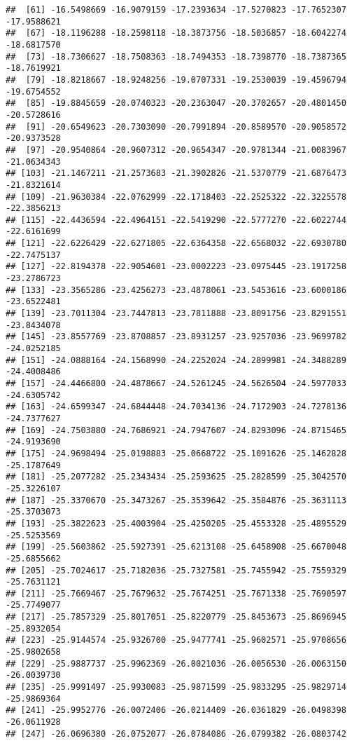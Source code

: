 \documentclass[
]{article}
\begin{document}
\begin{verbatim}
##  [61] -16.5498669 -16.9079159 -17.2393634 -17.5270823 -17.7652307 -17.9588621
##  [67] -18.1196288 -18.2598118 -18.3873756 -18.5036857 -18.6042274 -18.6817570
##  [73] -18.7306627 -18.7508363 -18.7494353 -18.7398770 -18.7387365 -18.7619921
##  [79] -18.8218667 -18.9248256 -19.0707331 -19.2530039 -19.4596794 -19.6754552
##  [85] -19.8845659 -20.0740323 -20.2363047 -20.3702657 -20.4801450 -20.5728616
##  [91] -20.6549623 -20.7303090 -20.7991894 -20.8589570 -20.9058572 -20.9373528
##  [97] -20.9540864 -20.9607312 -20.9654347 -20.9781344 -21.0083967 -21.0634343
## [103] -21.1467211 -21.2573683 -21.3902826 -21.5370779 -21.6876473 -21.8321614
## [109] -21.9630384 -22.0762999 -22.1718403 -22.2525322 -22.3225578 -22.3856213
## [115] -22.4436594 -22.4964151 -22.5419290 -22.5777270 -22.6022744 -22.6161699
## [121] -22.6226429 -22.6271805 -22.6364358 -22.6568032 -22.6930780 -22.7475137
## [127] -22.8194378 -22.9054601 -23.0002223 -23.0975445 -23.1917258 -23.2786723
## [133] -23.3565286 -23.4256273 -23.4878061 -23.5453616 -23.6000186 -23.6522481
## [139] -23.7011304 -23.7447813 -23.7811888 -23.8091756 -23.8291551 -23.8434078
## [145] -23.8557769 -23.8708857 -23.8931257 -23.9257036 -23.9699782 -24.0252185
## [151] -24.0888164 -24.1568990 -24.2252024 -24.2899981 -24.3488289 -24.4008486
## [157] -24.4466800 -24.4878667 -24.5261245 -24.5626504 -24.5977033 -24.6305742
## [163] -24.6599347 -24.6844448 -24.7034136 -24.7172903 -24.7278136 -24.7377627
## [169] -24.7503880 -24.7686921 -24.7947607 -24.8293096 -24.8715465 -24.9193690
## [175] -24.9698494 -25.0198883 -25.0668722 -25.1091626 -25.1462828 -25.1787649
## [181] -25.2077282 -25.2343434 -25.2593625 -25.2828599 -25.3042570 -25.3226107
## [187] -25.3370670 -25.3473267 -25.3539642 -25.3584876 -25.3631113 -25.3703073
## [193] -25.3822623 -25.4003904 -25.4250205 -25.4553328 -25.4895529 -25.5253569
## [199] -25.5603862 -25.5927391 -25.6213108 -25.6458908 -25.6670048 -25.6855662
## [205] -25.7024617 -25.7182036 -25.7327581 -25.7455942 -25.7559329 -25.7631121
## [211] -25.7669467 -25.7679632 -25.7674251 -25.7671338 -25.7690597 -25.7749077
## [217] -25.7857329 -25.8017051 -25.8220779 -25.8453673 -25.8696945 -25.8932054
## [223] -25.9144574 -25.9326700 -25.9477741 -25.9602571 -25.9708656 -25.9802658
## [229] -25.9887737 -25.9962369 -26.0021036 -26.0056530 -26.0063150 -26.0039730
## [235] -25.9991497 -25.9930083 -25.9871599 -25.9833295 -25.9829714 -25.9869364
## [241] -25.9952776 -26.0072406 -26.0214409 -26.0361829 -26.0498398 -26.0611928
## [247] -26.0696380 -26.0752077 -26.0784086 -26.0799382 -26.0803742
\end{verbatim}
\end{document}
